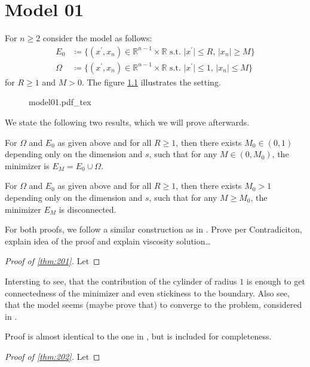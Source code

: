 \chapter{Model 01}
\label{ch:model01}

For \( n \geq 2 \) consider the model as follows:
\begin{align}
	E_0    & \coloneqq \{(x^\prime,x_n) \in \mathbb{R}^{n-1} \times \mathbb{R} \text{ s.t. } \lvert x^\prime \rvert \leq R, \, \lvert x_n \rvert \geq M \} \\
	\Omega & \coloneqq \{(x^\prime,x_n) \in \mathbb{R}^{n-1} \times \mathbb{R} \text{ s.t. } \lvert x^\prime \rvert \leq 1, \, \lvert x_n \rvert \leq M \}
\end{align}
for \( R \geq 1 \) and \( M > 0 \). The figure \cref{fig:201} illustrates the setting.

\begin{figure}[h]
	\centering
	\def\svgwidth{0.5\textwidth}
	{model01.pdf_tex}
	\caption{}
	\label{fig:201}
\end{figure}

We state the following two results, which we will prove afterwards.

\begin{theorem}
	\label{thm:201}
	For \( \Omega \) and \( E_0 \) as given above and for all \( R \geq 1 \), then there
	exists \( M_0 \in (0,1) \) depending only on the dimension and \( s \), such that
	for any \( M \in (0, M_0) \), the minimizer is \( E_M = E_0 \cup \Omega \).
\end{theorem}

\begin{theorem}
	\label{thm:202}
	For \( \Omega \) and \( E_0 \) as given above and for all \( R \geq 1 \), then there
	exists \( M_0 > 1 \) depending only on the dimension and \( s \), such that
	for any \( M \geq  M_0 \), the minimizer \( E_M \) is disconnected.
\end{theorem}

For both proofs, we follow a similar construction as in
\cite{dipierro2020disconnectedness}. \newline
Prove per Contradiciton, explain idea of the proof and explain viscosity solution\ldots 

\begin{proof}[Proof of \cref{thm:201}] 
    Let 
\end{proof}

Intersting to see, that the contribution of the cylinder of radius \( 1 \) is enough to
get connectedness of the minimizer and even stickiness to the boundary. Also see, that the
model seems (maybe prove that) to converge to the problem, considered in
\cite{dipierro2020disconnectedness}.\newline


Proof is almost identical to the one in \cite{dipierro2020disconnectedness}, but is
included for completeness.
\begin{proof}[Proof of \cref{thm:202}] 
    Let
\end{proof}